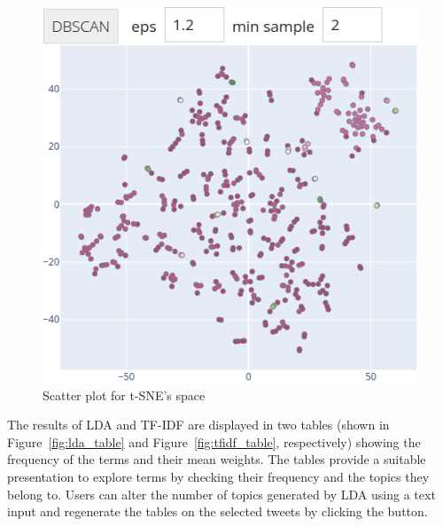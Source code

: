 \begin{figure}[H]
\begin{center}
  \includegraphics[width=0.5\columnwidth]{./images/scatter.png}
\end{center}
\caption{Scatter plot for \ac{t-SNE}'s space}
\label{fig:scatter}
\end{figure}

The results of \ac{LDA} and \ac{TF-IDF} are displayed in two tables (shown in
Figure~\ref{fig:lda_table} and Figure~\ref{fig:tfidf_table}, respectively)  showing the frequency of
the terms and their mean weights. The tables provide a suitable presentation to explore terms by
checking their frequency and the topics they belong to. Users can alter the number of topics
generated by \ac{LDA} using a text input and regenerate the tables on the selected tweets by
clicking the button. 

